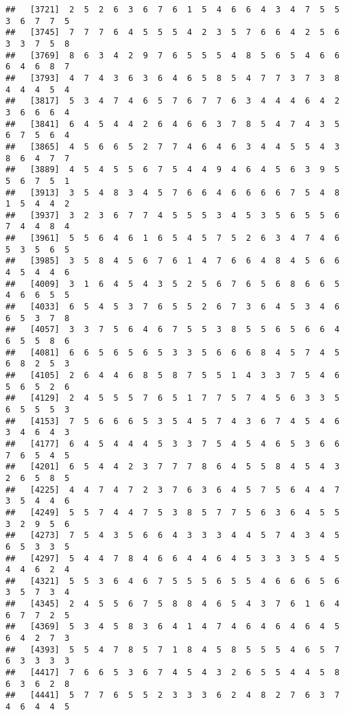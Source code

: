 \documentclass[
]{book}
\begin{document}
\begin{verbatim}
##   [3721]  2  5  2  6  3  6  7  6  1  5  4  6  6  4  3  4  7  5  5  3  6  7  7  5
##   [3745]  7  7  7  6  4  5  5  5  4  2  3  5  7  6  6  4  2  5  6  3  3  7  5  8
##   [3769]  8  6  3  4  2  9  7  6  5  5  5  4  8  5  6  5  4  6  6  6  4  6  8  7
##   [3793]  4  7  4  3  6  3  6  4  6  5  8  5  4  7  7  3  7  3  8  4  4  4  5  4
##   [3817]  5  3  4  7  4  6  5  7  6  7  7  6  3  4  4  4  6  4  2  3  6  6  6  4
##   [3841]  6  4  5  4  4  2  6  4  6  6  3  7  8  5  4  7  4  3  5  6  7  5  6  4
##   [3865]  4  5  6  6  5  2  7  7  4  6  4  6  3  4  4  5  5  4  3  8  6  4  7  7
##   [3889]  4  5  4  5  5  6  7  5  4  4  9  4  6  4  5  6  3  9  5  5  6  7  5  1
##   [3913]  3  5  4  8  3  4  5  7  6  6  4  6  6  6  6  7  5  4  8  1  5  4  4  2
##   [3937]  3  2  3  6  7  7  4  5  5  5  3  4  5  3  5  6  5  5  6  7  4  4  8  4
##   [3961]  5  5  6  4  6  1  6  5  4  5  7  5  2  6  3  4  7  4  6  5  3  5  6  5
##   [3985]  3  5  8  4  5  6  7  6  1  4  7  6  6  4  8  4  5  6  6  4  5  4  4  6
##   [4009]  3  1  6  4  5  4  3  5  2  5  6  7  6  5  6  8  6  6  5  4  6  6  5  5
##   [4033]  6  5  4  5  3  7  6  5  5  2  6  7  3  6  4  5  3  4  6  6  5  3  7  8
##   [4057]  3  3  7  5  6  4  6  7  5  5  3  8  5  5  6  5  6  6  4  6  5  5  8  6
##   [4081]  6  6  5  6  5  6  5  3  3  5  6  6  6  8  4  5  7  4  5  6  8  2  5  3
##   [4105]  2  6  4  4  6  8  5  8  7  5  5  1  4  3  3  7  5  4  6  5  6  5  2  6
##   [4129]  2  4  5  5  5  7  6  5  1  7  7  5  7  4  5  6  3  3  5  6  5  5  5  3
##   [4153]  7  5  6  6  6  5  3  5  4  5  7  4  3  6  7  4  5  4  6  3  4  6  4  3
##   [4177]  6  4  5  4  4  4  5  3  3  7  5  4  5  4  6  5  3  6  6  7  6  5  4  5
##   [4201]  6  5  4  4  2  3  7  7  7  8  6  4  5  5  8  4  5  4  3  2  6  5  8  5
##   [4225]  4  4  7  4  7  2  3  7  6  3  6  4  5  7  5  6  4  4  7  3  5  4  4  6
##   [4249]  5  5  7  4  4  7  5  3  8  5  7  7  5  6  3  6  4  5  5  3  2  9  5  6
##   [4273]  7  5  4  3  5  6  6  4  3  3  3  4  4  5  7  4  3  4  5  6  5  3  3  5
##   [4297]  5  4  4  7  8  4  6  6  4  4  6  4  5  3  3  3  5  4  5  4  4  6  2  4
##   [4321]  5  5  3  6  4  6  7  5  5  5  6  5  5  4  6  6  6  5  6  3  5  7  3  4
##   [4345]  2  4  5  5  6  7  5  8  8  4  6  5  4  3  7  6  1  6  4  6  7  7  2  5
##   [4369]  5  3  4  5  8  3  6  4  1  4  7  4  6  4  6  4  6  4  5  6  4  2  7  3
##   [4393]  5  5  4  7  8  5  7  1  8  4  5  8  5  5  5  4  6  5  7  6  3  3  3  3
##   [4417]  7  6  6  5  3  6  7  4  5  4  3  2  6  5  5  4  4  5  8  6  3  6  2  8
##   [4441]  5  7  7  6  5  5  2  3  3  3  6  2  4  8  2  7  6  3  7  4  6  4  4  5

\end{verbatim}
\end{document}
